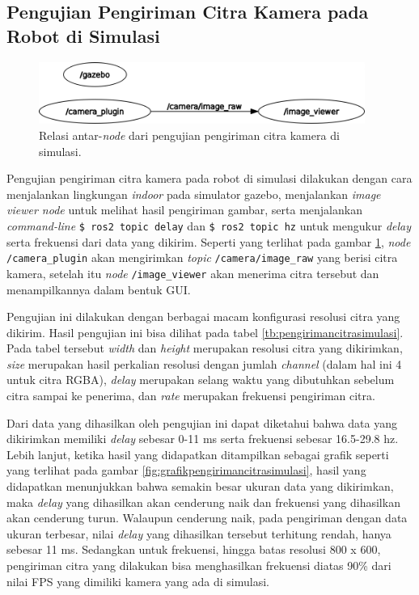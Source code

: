 \subsection{Pengujian Pengiriman Citra Kamera pada Robot di Simulasi}
\label{subsec:citrasimulasi}

\begin{figure}[ht]
  \centering
  \includegraphics[width=0.95\textwidth,keepaspectratio]{gambar/rosgraph-camera-plugin.png}
  \caption{Relasi antar-\emph{node} dari pengujian pengiriman citra kamera di simulasi.}
  \label{fig:rosgraphcameraplugin}
\end{figure}

Pengujian pengiriman citra kamera pada robot di simulasi dilakukan dengan cara menjalankan lingkungan \emph{indoor} pada simulator gazebo,
  menjalankan \emph{image viewer node} untuk melihat hasil pengiriman gambar,
  serta menjalankan \emph{command-line} \lstinline{$ ros2 topic delay} dan \lstinline{$ ros2 topic hz} untuk mengukur \emph{delay} serta frekuensi dari data yang dikirim.
Seperti yang terlihat pada gambar \ref{fig:rosgraphcameraplugin},
  \emph{node} \lstinline{/camera_plugin} akan mengirimkan \emph{topic} \lstinline{/camera/image_raw} yang berisi citra kamera,
  setelah itu \emph{node} \lstinline{/image_viewer} akan menerima citra tersebut dan menampilkannya dalam bentuk GUI.



Pengujian ini dilakukan dengan berbagai macam konfigurasi resolusi citra yang dikirim.
Hasil pengujian ini bisa dilihat pada tabel \ref{tb:pengirimancitrasimulasi}.
Pada tabel tersebut \emph{width} dan \emph{height} merupakan resolusi citra yang dikirimkan,
  \emph{size} merupakan hasil perkalian resolusi dengan jumlah \emph{channel} (dalam hal ini 4 untuk citra RGBA),
  \emph{delay} merupakan selang waktu yang dibutuhkan sebelum citra sampai ke penerima,
  dan \emph{rate} merupakan frekuensi pengiriman citra.

Dari data yang dihasilkan oleh pengujian ini dapat diketahui bahwa data yang dikirimkan memiliki \emph{delay} sebesar 0-11 ms serta frekuensi sebesar 16.5-29.8 hz.
Lebih lanjut, ketika hasil yang didapatkan ditampilkan sebagai grafik seperti yang terlihat pada gambar \ref{fig:grafikpengirimancitrasimulasi},
  hasil yang didapatkan menunjukkan bahwa semakin besar ukuran data yang dikirimkan,
  maka \emph{delay} yang dihasilkan akan cenderung naik dan frekuensi yang dihasilkan akan cenderung turun.
Walaupun cenderung naik, pada pengiriman dengan data ukuran terbesar,
  nilai \emph{delay} yang dihasilkan tersebut terhitung rendah, hanya sebesar 11 ms.
Sedangkan untuk frekuensi,
  hingga batas resolusi 800 x 600,
  pengiriman citra yang dilakukan bisa menghasilkan frekuensi diatas 90\% dari nilai FPS yang dimiliki kamera yang ada di simulasi.


